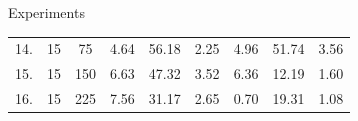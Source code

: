 \documentclass[10pt,xcolor=pdflatex]{beamer}
\begin{document}
\begin{frame}{Experiments}
\begin{table}[H]
\begin{adjustbox}{max width=\textwidth}
\begin{tabular}{@{}ccccccccc@{}}
14. & 15    & 75        & 4.64       & 56.18     & 2.25             & 4.96       & 51.74      & 3.56           \\
15. & 15    & 150       & 6.63       & 47.32     & 3.52             & 6.36       & 12.19      & 1.60           \\
16. & 15    & 225       & 7.56       & 31.17     & 2.65             & 0.70       & 19.31      & 1.08           \\
    \bottomrule
\end{tabular}
\end{adjustbox}
\end{table}
\end{frame}
\end{document}
